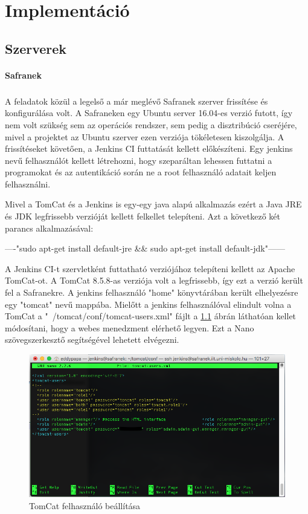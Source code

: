 \chapter{Implementáció}

\section{Szerverek}

\subsubsection{Safranek}

\paragraph{}
A feladatok közül a legelső a már meglévő Safranek szerver frissítése és konfigurálása volt. 
A Safraneken egy Ubuntu server 16.04-es verzió futott, így nem volt szükség sem az operációs rendszer, sem pedig a disztribúció cseréjére, mivel a projektet az Ubuntu szerver ezen verziója tökéletesen kiszolgálja.
A frissítéseket követően, a Jenkins CI futtatását kellett előkészíteni. 
Egy jenkins nevű felhasználót kellett létrehozni, hogy szeparáltan lehessen futtatni a programokat és az autentikáció során ne a root felhasználó adatait keljen felhasználni. 

Mivel a TomCat és a Jenkins is egy-egy java alapú alkalmazás ezért a Java JRE és JDK legfrissebb verzióját kellett felkellet telepíteni. 
Azt a következő két parancs alkalmazásával: 

----"sudo apt-get install default-jre \&\& sudo apt-get install default-jdk"------

A Jenkins CI-t szervletként futtatható verziójához telepíteni kellett az Apache TomCat-ot. 
A TomCat 8.5.8-as verziója volt a legfrissebb, így ezt a verzió került fel a Safranekre. 
A jenkins felhasználó "home" könyvtárában került elhelyezésre egy "tomcat" nevű mappába. 
Mielőtt a jenkins felhasználóval elindult volna a TomCat a "~/tomcat/conf/tomcat-users.xml" fájlt a \ref{fig:tomcatxml} ábrán láthatóan kellet módosítani, hogy a webes menedzment elérhető legyen. 
Ezt a Nano szövegszerkesztő segítségével lehetett elvégezni. 

\begin{figure}[h]
	\centering
	\includegraphics[width=1\linewidth]{pics/tomcatxml}
	\caption{TomCat felhasználó beállítása}
	\label{fig:tomcatxml}
\end{figure}

